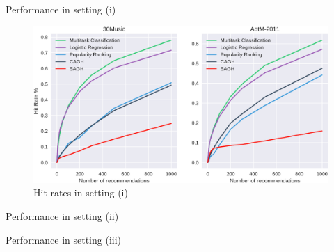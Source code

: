 \begin{table}[h]
\centering
\caption{Performance in setting (i)}
\label{tab:perf0}
\resizebox{\columnwidth}{!}{

}
\end{table}

\begin{figure}[h]
\centering
\includegraphics[width=.975\linewidth]{fig/hitrate0.pdf}
\caption{Hit rates in setting (i)}
\label{fig:hr0}
\end{figure}


\begin{table}[!t]
    \centering
    \begin{minipage}{.5\textwidth}
        \centering
        \caption{Performance in setting (ii)}
        \label{tab:perf1}
        \resizebox{.95\textwidth}{!}{
        
        }
    \end{minipage}%
    \begin{minipage}{0.5\textwidth}
        \centering
        \caption{Performance in setting (iii)}
        \label{tab:perf2}
        \resizebox{.95\textwidth}{!}{
        
        }
    \end{minipage}
\end{table}


